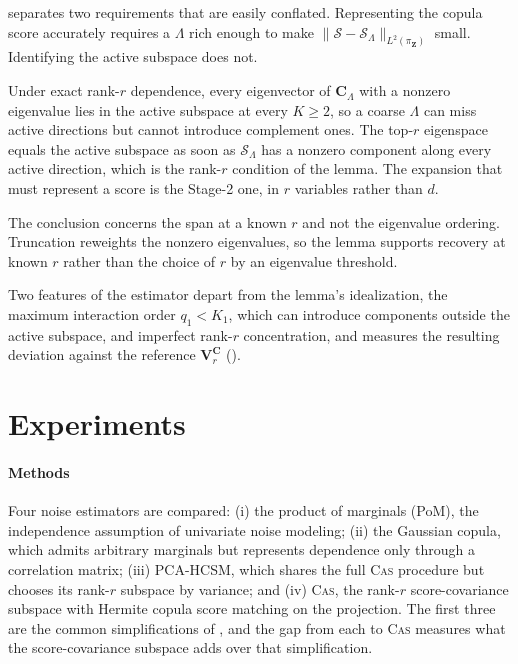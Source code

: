 \documentclass[review,hidelinks,onefignum,onetabnum]{siamart251216}
\newcommand{\mC}{\bm{C}}
\newcommand{\mV}{\bm{V}}
\newcommand{\vZ}{\bm{Z}}
\newcommand{\scS}{\mathcal{S}}
\begin{document}
\begin{remark}
\label{rem:pilot-subspace}
 separates two requirements that are easily conflated. Representing the copula score accurately requires a $\Lambda$ rich enough to make $\|\scS - \scS_\Lambda\|_{L^2(\pi_{\vZ})}$ small. Identifying the active subspace does not.

Under exact rank-$r$ dependence, every eigenvector of $\mC_\Lambda$ with a nonzero eigenvalue lies in the active subspace at every $K \geq 2$, so a coarse $\Lambda$ can miss active directions but cannot introduce complement ones. The top-$r$ eigenspace equals the active subspace as soon as $\scS_\Lambda$ has a nonzero component along every active direction, which is the rank-$r$ condition of the lemma. The expansion that must represent a score is the Stage-2 one, in $r$ variables rather than $d$.

The conclusion concerns the span at a known $r$ and not the eigenvalue ordering. Truncation reweights the nonzero eigenvalues, so the lemma supports recovery at known $r$ rather than the choice of $r$ by an eigenvalue threshold.

Two features of the estimator depart from the lemma's idealization, the maximum interaction order $q_1 < K_1$, which can introduce components outside the active subspace, and imperfect rank-$r$ concentration, and  measures the resulting deviation against the reference $\mV_r^{\mC}$ ().
\end{remark}

\section{Experiments}
\label{sec:experiments}

\paragraph{Methods} Four noise estimators are compared: (i) the product of marginals (PoM), the independence assumption of univariate noise modeling; (ii) the Gaussian copula, which admits arbitrary marginals but represents dependence only through a correlation matrix; (iii) PCA-HCSM, which shares the full \textsc{Cas} procedure but chooses its rank-$r$ subspace by variance; and (iv) \textsc{Cas}, the rank-$r$ score-covariance subspace with Hermite copula score matching on the projection. The first three are the common simplifications of , and the gap from each to \textsc{Cas} measures what the score-covariance subspace adds over that simplification.
\end{document}
